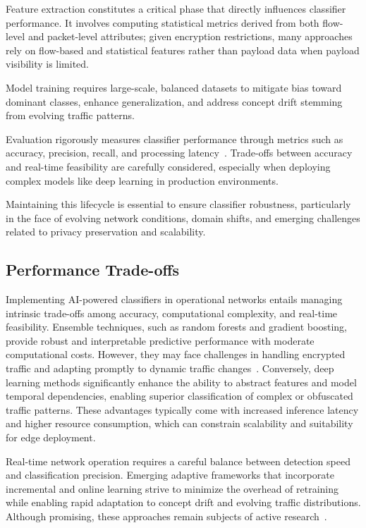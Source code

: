 \documentclass[sigconf]{acmart}
\begin{document}
Feature extraction constitutes a critical phase that directly influences classifier performance. It involves computing statistical metrics derived from both flow-level and packet-level attributes; given encryption restrictions, many approaches rely on flow-based and statistical features rather than payload data when payload visibility is limited.

Model training requires large-scale, balanced datasets to mitigate bias toward dominant classes, enhance generalization, and address concept drift stemming from evolving traffic patterns.

Evaluation rigorously measures classifier performance through metrics such as accuracy, precision, recall, and processing latency~\cite{ref51}. Trade-offs between accuracy and real-time feasibility are carefully considered, especially when deploying complex models like deep learning in production environments.

Maintaining this lifecycle is essential to ensure classifier robustness, particularly in the face of evolving network conditions, domain shifts, and emerging challenges related to privacy preservation and scalability.

\subsection{Performance Trade-offs}

Implementing AI-powered classifiers in operational networks entails managing intrinsic trade-offs among accuracy, computational complexity, and real-time feasibility. Ensemble techniques, such as random forests and gradient boosting, provide robust and interpretable predictive performance with moderate computational costs. However, they may face challenges in handling encrypted traffic and adapting promptly to dynamic traffic changes~\cite{ref51}. Conversely, deep learning methods significantly enhance the ability to abstract features and model temporal dependencies, enabling superior classification of complex or obfuscated traffic patterns. These advantages typically come with increased inference latency and higher resource consumption, which can constrain scalability and suitability for edge deployment.

Real-time network operation requires a careful balance between detection speed and classification precision. Emerging adaptive frameworks that incorporate incremental and online learning strive to minimize the overhead of retraining while enabling rapid adaptation to concept drift and evolving traffic distributions. Although promising, these approaches remain subjects of active research~\cite{ref51}.
\end{document}
